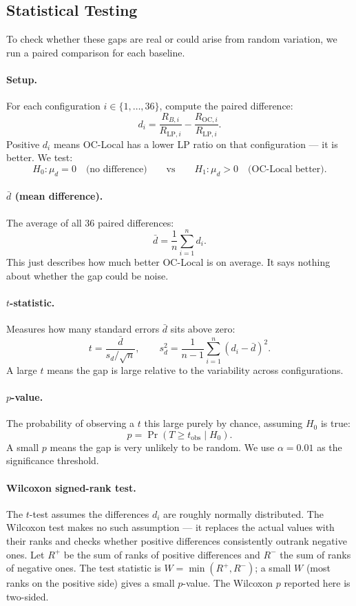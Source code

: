 \documentclass[11pt]{article}
\begin{document}
\subsection{Statistical Testing}

To check whether these gaps are real or could arise from random variation, we run a paired comparison for each baseline.

\paragraph{Setup.} For each configuration $i \in \{1, \dots, 36\}$, compute the paired difference:
\[
d_i = \frac{R_{B,i}}{R_{\mathrm{LP},i}} - \frac{R_{\mathrm{OC},i}}{R_{\mathrm{LP},i}}.
\]
Positive $d_i$ means OC-Local has a lower LP ratio on that configuration --- it is better. We test:
\[
H_0: \mu_d = 0 \quad \text{(no difference)} \qquad \text{vs} \qquad H_1: \mu_d > 0 \quad \text{(OC-Local better)}.
\]

\paragraph{$\bar{d}$ (mean difference).} The average of all 36 paired differences:
\[
\bar{d} = \frac{1}{n}\sum_{i=1}^{n} d_i.
\]
This just describes how much better OC-Local is on average. It says nothing about whether the gap could be noise.

\paragraph{$t$-statistic.} Measures how many standard errors $\bar{d}$ sits above zero:
\[
t = \frac{\bar{d}}{s_d / \sqrt{n}}, \qquad s_d^2 = \frac{1}{n-1}\sum_{i=1}^{n}(d_i - \bar{d})^2.
\]
A large $t$ means the gap is large relative to the variability across configurations.

\paragraph{$p$-value.} The probability of observing a $t$ this large purely by chance, assuming $H_0$ is true:
\[
p = \Pr(T \ge t_{\mathrm{obs}} \mid H_0).
\]
A small $p$ means the gap is very unlikely to be random. We use $\alpha = 0.01$ as the significance threshold.

\paragraph{Wilcoxon signed-rank test.} The $t$-test assumes the differences $d_i$ are roughly normally distributed. The Wilcoxon test makes no such assumption --- it replaces the actual values with their ranks and checks whether positive differences consistently outrank negative ones. Let $R^+$ be the sum of ranks of positive differences and $R^-$ the sum of ranks of negative ones. The test statistic is $W = \min(R^+, R^-)$; a small $W$ (most ranks on the positive side) gives a small $p$-value. The Wilcoxon $p$ reported here is two-sided.
\end{document}
